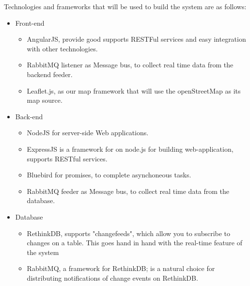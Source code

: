 Technologies and frameworks that will be used to build the system are as follows:
\begin{itemize}
\item Front-end
\begin{itemize}
	\item AngularJS, provide good supports RESTFul services and easy integration with other technologies.
	\item RabbitMQ listener as Message bus, to collect real time data from the backend feeder.
	\item Leaflet.js, as our map framework that will use the openStreetMap as its map source.
\end{itemize}
\item Back-end
\begin{itemize}
	\item NodeJS for server-side Web applications.
	\item ExpressJS is a framework for on node.js for building web-application, supports RESTful services.
	\item Bluebird for promises, to complete asynchoneous tasks.
	\item RabbitMQ feeder as Message bus, to collect real time data from the database.
\end{itemize}
\item Database
\begin{itemize}
	\item RethinkDB, supports "changefeeds", which allow you to subscribe to changes on a table. This goes hand in hand with the real-time feature of the system
	\item RabbitMQ, a framework for RethinkDB; is a natural choice for distributing notifications of change events on RethinkDB.
\end{itemize}

\end{itemize}
